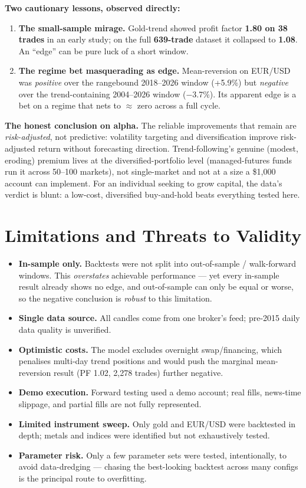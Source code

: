 \documentclass[11pt,a4paper]{article}
\begin{document}
\noindent\textbf{Two cautionary lessons, observed directly:}
\begin{enumerate}[leftmargin=1.6em]
  \item \textbf{The small-sample mirage.} Gold-trend showed profit factor \textbf{1.80 on 38 trades} in an early study; on the full \textbf{639-trade} dataset it collapsed to \textbf{1.08}. An ``edge'' can be pure luck of a short window.
  \item \textbf{The regime bet masquerading as edge.} Mean-reversion on EUR/USD was \emph{positive} over the rangebound 2018--2026 window (+5.9\%) but \emph{negative} over the trend-containing 2004--2026 window ($-$3.7\%). Its apparent edge is a bet on a regime that nets to $\approx$ zero across a full cycle.
\end{enumerate}

\noindent\textbf{The honest conclusion on alpha.} The reliable improvements that remain are \emph{risk-adjusted}, not predictive: volatility targeting and diversification improve risk-adjusted return without forecasting direction. Trend-following's genuine (modest, eroding) premium lives at the diversified-portfolio level (managed-futures funds run it across 50--100 markets), not single-market and not at a size a \$1{,}000 account can implement. For an individual seeking to grow capital, the data's verdict is blunt: a low-cost, diversified buy-and-hold beats everything tested here.

\section{Limitations and Threats to Validity}
\begin{itemize}[leftmargin=1.4em]
  \item \textbf{In-sample only.} Backtests were not split into out-of-sample / walk-forward windows. This \emph{overstates} achievable performance --- yet every in-sample result already shows no edge, and out-of-sample can only be equal or worse, so the negative conclusion is \emph{robust} to this limitation.
  \item \textbf{Single data source.} All candles come from one broker's feed; pre-2015 daily data quality is unverified.
  \item \textbf{Optimistic costs.} The model excludes overnight swap/financing, which penalises multi-day trend positions and would push the marginal mean-reversion result (PF 1.02, 2{,}278 trades) further negative.
  \item \textbf{Demo execution.} Forward testing used a demo account; real fills, news-time slippage, and partial fills are not fully represented.
  \item \textbf{Limited instrument sweep.} Only gold and EUR/USD were backtested in depth; metals and indices were identified but not exhaustively tested.
  \item \textbf{Parameter risk.} Only a few parameter sets were tested, intentionally, to avoid data-dredging --- chasing the best-looking backtest across many configs is the principal route to overfitting.
\end{itemize}
\end{document}
